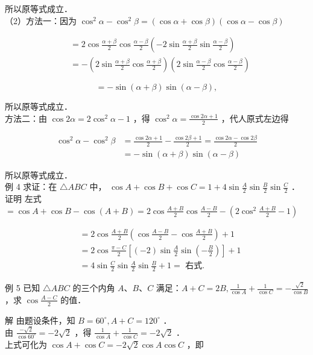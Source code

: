 \documentclass[10pt]{article}
\begin{document}
所以原等式成立．\\
（2）方法一：因为 \(\cos ^{2} \alpha-\cos ^{2} \beta=(\cos \alpha+\cos \beta)(\cos \alpha-\cos \beta)\)

\[
\begin{aligned}
& =2 \cos \frac{\alpha+\beta}{2} \cos \frac{\alpha-\beta}{2}\left(-2 \sin \frac{\alpha+\beta}{2} \sin \frac{\alpha-\beta}{2}\right) \\
& =-\left(2 \sin \frac{\alpha+\beta}{2} \cos \frac{\alpha+\beta}{2}\right)\left(2 \sin \frac{\alpha-\beta}{2} \cos \frac{\alpha-\beta}{2}\right)
\end{aligned}
\]

\[
=-\sin (\alpha+\beta) \sin (\alpha-\beta),
\]

所以原等式成立．\\
方法二：由 \(\cos 2 \alpha=2 \cos ^{2} \alpha-1\) ，得 \(\cos ^{2} \alpha=\frac{\cos 2 \alpha+1}{2}\) ，代人原式左边得

\[
\begin{aligned}
\cos ^{2} \alpha-\cos ^{2} \beta & =\frac{\cos 2 \alpha+1}{2}-\frac{\cos 2 \beta+1}{2}=\frac{\cos 2 \alpha-\cos 2 \beta}{2} \\
& =-\sin (\alpha+\beta) \sin (\alpha-\beta)
\end{aligned}
\]

所以原等式成立．\\
例 4 求证：在 \(\triangle A B C\) 中， \(\cos A+\cos B+\cos C=1+4 \sin \frac{A}{2} \sin \frac{B}{2} \sin \frac{C}{2}\) ．\\
证明 左式 \(=\cos A+\cos B-\cos (A+B)=2 \cos \frac{A+B}{2} \cos \frac{A-B}{2}-\left(2 \cos ^{2} \frac{A+B}{2}-1\right)\)

\[
\begin{aligned}
& =2 \cos \frac{A+B}{2}\left(\cos \frac{A-B}{2}-\cos \frac{A+B}{2}\right)+1 \\
& =2 \cos \frac{\pi-C}{2}\left[(-2) \sin \frac{A}{2} \sin \left(-\frac{B}{2}\right)\right]+1 \\
& =4 \sin \frac{C}{2} \sin \frac{A}{2} \sin \frac{B}{2}+1=\text { 右式. }
\end{aligned}
\]

例 5 已知 \(\triangle A B C\) 的三个内角 \(A 、 B 、 C\) 满足：\(A+C=2 B, \frac{1}{\cos A}+\frac{1}{\cos C}=-\frac{\sqrt{2}}{\cos B}\) ，求 \(\cos \frac{A-C}{2}\) 的值．

解 由题设条件，知 \(B=60^{\circ}, A+C=120^{\circ}\) ．\\
由 \(\frac{-\sqrt{2}}{\cos 60^{\circ}}=-2 \sqrt{2}\) ，得 \(\frac{1}{\cos A}+\frac{1}{\cos C}=-2 \sqrt{2}\) ．\\
上式可化为 \(\cos A+\cos C=-2 \sqrt{2} \cos A \cos C\) ，即
\end{document}

